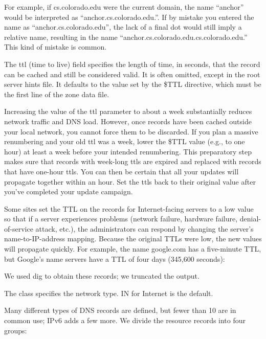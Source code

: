 For example, if cs.colorado.edu were the current domain, the name
``anchor'' would be interpreted as ``anchor.cs.colorado.edu.''. If by
mistake you entered the name as ``anchor.cs.colorado.edu'', the lack of
a final dot would still imply a relative name, resulting in the name
``anchor.cs.colorado.edu.cs.colorado.edu.'' This kind of mistake is
common.

\protect\hypertarget{part0024_split_021.htmlux5cux23_idTextAnchor871}{}{}The{
ttl} (time to live) field specifies the length of time, in seconds, that
the record can be cached and still be considered valid. It is often
omitted, except in the root server hints file. It defaults to the value
set by the {\$TTL} directive, which must be the first line of the zone
data file.

Increasing the value of the {ttl} parameter to about a week
substantially reduces network traffic and DNS load. However, once
records have been cached outside your local network, you cannot force
them to be discarded. If you plan a massive renumbering and your old
{ttl} was a week, lower the {\$TTL} value (e.g., to one hour) at least a
week before your intended renumbering. This preparatory step makes sure
that records with week-long {ttl}s are expired and replaced with records
that have one-hour {ttl}s. You can then be certain that all your updates
will propagate together within an hour. Set the {ttl}s back to their
original value after you've completed your update campaign.

Some sites set the TTL on the records for Internet-facing servers to a
low value so that if a server experiences problems (network failure,
hardware failure,
\protect\hypertarget{part0024_split_021.htmlux5cux23_idIndexMarker2065}{}{}{denial}-of-{service}
attack, etc.), the administrators can respond by changing the server's
name-to-IP-address mapping. Because the original TTLs were low, the new
values will propagate quickly. For example, the name google.com has a
five-minute TTL, but Google's name servers have a TTL of four days
(345,600 seconds):


We used {dig} to obtain these records; we truncated the output.

The {class} specifies the network type. IN for Internet is the default.

Many different types of DNS records are defined, but fewer than 10 are
in common use; IPv6 adds a few more. We divide the resource records into
four groups:

